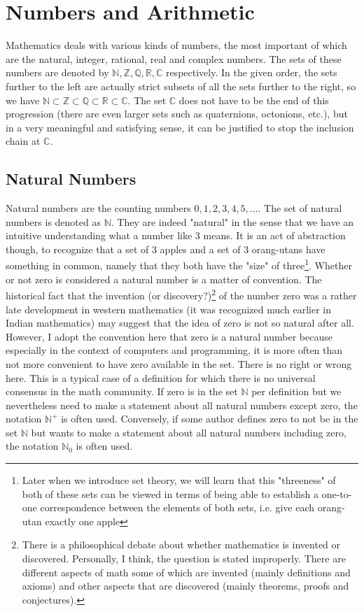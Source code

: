 \section{Numbers and Arithmetic} 

Mathematics deals with various kinds of numbers, the most important of which are the natural, integer, rational, real and complex numbers. The sets of these numbers are denoted by  $\mathbb{N,Z,Q,R,C}$ respectively. In the given order, the sets further to the left are actually strict subsets of all the sets further to the right, so we have $\mathbb{N \subset Z \subset Q \subset R \subset C}$. The set $\mathbb{C}$ does not have to be the end of this progression (there are even larger sets such as quaternions, octonions, etc.), but in a very meaningful and satisfying sense, it can be justified to stop the inclusion chain at $\mathbb{C}$.

\subsection{Natural Numbers}
Natural numbers are the counting numbers $0,1,2,3,4,5,\ldots$. The set of natural numbers is denoted as $\mathbb{N}$. They are indeed "natural" in the sense that we have an intuitive understanding what a number like $3$ means. It is an act of abstraction though, to recognize that a set of 3 apples and a set of 3 orang-utans have something in common, namely that they both have the "size" of three\footnote{Later when we introduce set theory, we will learn that this "threeness" of both of these sets can be viewed in terms of being able to establish a one-to-one correspondence between the elements of both sets, i.e. give each orang-utan exactly one apple}. Whether or not zero is considered a natural number is a matter of convention. The historical fact that the invention (or discovery?)\footnote{There is a philosophical debate about whether mathematics is invented or discovered. Personally, I think, the question is stated improperly. There are different aspects of math some of which are invented (mainly definitions and axioms) and other aspects that are discovered (mainly theorems, proofs and conjectures).} of the number zero was a rather late development in western mathematics (it was recognized much earlier in Indian mathematics) may suggest that the idea of zero is not so natural after all. However, I adopt the convention here that zero is a natural number because especially in the context of computers and programming, it is more often than not more convenient to have zero available in the set. There is no right or wrong here. This is a typical case of a definition for which there is no universal consensus in the math community. If zero is in the set $\mathbb{N}$ per definition but we nevertheless need to make a statement about all natural numbers except zero, the notation $\mathbb{N}^+$ is often used. Conversely, if some author defines zero to not be in the set $\mathbb{N}$ but wants to make a statement about all natural numbers including zero, the notation $\mathbb{N}_0$ is often used.

